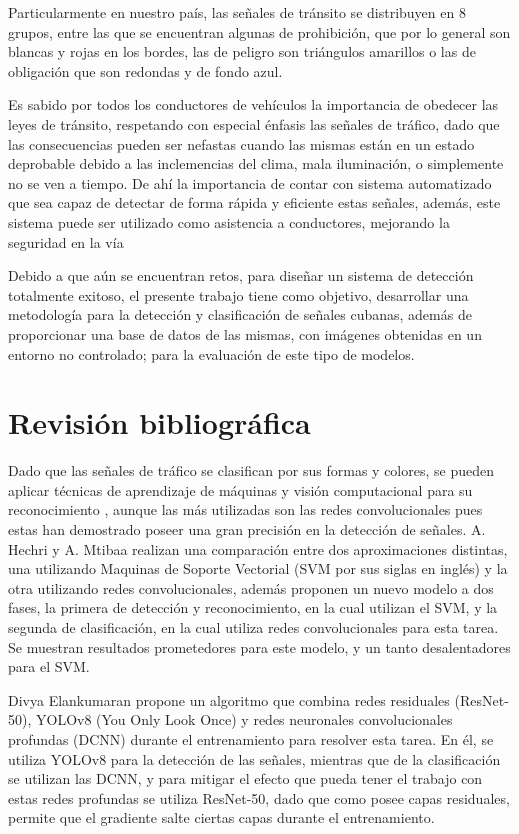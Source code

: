 \documentclass{article}
\begin{document}
Particularmente en nuestro país, las señales de tránsito se distribuyen en 8 grupos\cite{ref7}, entre las que se encuentran algunas de prohibición, que por lo general son blancas y rojas en los bordes, las de peligro son triángulos amarillos o las de obligación que son redondas y de fondo azul.

Es sabido por todos los conductores de vehículos la importancia de obedecer las leyes de tránsito, respetando con especial énfasis las señales de tráfico, dado que las consecuencias pueden ser nefastas cuando las mismas están en un estado deprobable debido a las inclemencias del clima, mala iluminación, o simplemente no se ven a tiempo. De ahí la importancia de contar con sistema automatizado que sea capaz de detectar de forma rápida y eficiente estas señales, además, este sistema puede ser utilizado como asistencia a conductores, mejorando la seguridad en la vía

Debido a que aún se encuentran retos, para diseñar un sistema de detección totalmente exitoso, el presente trabajo tiene como objetivo, desarrollar una metodología para la detección y clasificación de señales cubanas, además de proporcionar una base de datos de las mismas, con imágenes obtenidas en un entorno no controlado; para la evaluación de este tipo de modelos.


\newpage
\section{Revisión bibliográfica}
Dado que las señales de tráfico se clasifican por sus formas y colores, se pueden aplicar técnicas de aprendizaje de máquinas y visión computacional para su reconocimiento \cite{ref6}, aunque las más utilizadas son las redes convolucionales pues estas han demostrado poseer una gran precisión en la detección de señales. A. Hechri y A. Mtibaa \cite{ref8} realizan una comparación entre dos aproximaciones distintas, una utilizando Maquinas de Soporte Vectorial (SVM por sus siglas en inglés) y la otra utilizando redes convolucionales, además proponen un nuevo modelo a dos fases, la primera de detección y reconocimiento, en la cual utilizan el SVM, y la segunda de clasificación, en la cual utiliza redes convolucionales para esta tarea. Se muestran resultados prometedores para este modelo, y un tanto desalentadores para el SVM.

Divya Elankumaran \cite{ref5} propone un algoritmo que combina redes residuales (ResNet-50), YOLOv8 (You Only Look Once) y redes neuronales convolucionales profundas (DCNN) durante el entrenamiento para resolver esta tarea. En él, se utiliza YOLOv8 para la detección de las señales, mientras que de la clasificación se utilizan las DCNN, y para mitigar el efecto que pueda tener el trabajo con estas redes profundas se utiliza ResNet-50, dado que como posee capas residuales, permite que el gradiente salte ciertas capas durante el entrenamiento.
\end{document}
